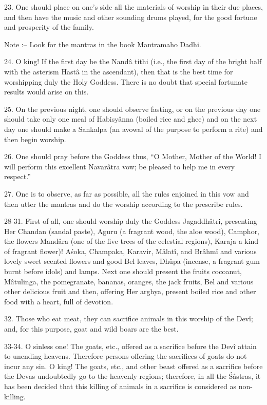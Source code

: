 23. One should place on one's side all the materials of worship in their due places, and then have the music and other sounding drums played, for the good fortune and prosperity of the family.

Note :-- Look for the mantras in the book Mantramaho Dadhi.

24. O king! If the first day be the Nand\^a tithi (i.e., the first day of the bright half with the asterism Hast\^a in the ascendant), then that is the best time for worshipping duly the Holy Goddess. There is no doubt that special fortunate results would arise on this.

25. On the previous night, one should observe fasting, or on the previous day one should take only one meal of Habisy\^anna (boiled rice and ghee) and on the next day one should make a Sankalpa (an avowal of the purpose to perform a rite) and then begin worship.

26. One should pray before the Goddess thus, ``O Mother, Mother of the World! I will perform this excellent Navar\^atra vow; be pleased to help me in every respect.''

27. One is to observe, as far as possible, all the rules enjoined in this vow and then utter the mantras and do the worship according to the prescribe rules.

28-31. First of all, one should worship duly the Goddess Jagaddh\^atri, presenting Her Chandan (sandal paste), Aguru (a fragrant wood, the aloe wood), Camphor, the flowers Mand\^ara (one of the five trees of the celestial regions), Karaja a kind of fragrant flower)! A\'soka, Champaka, Karavir, M\^alat\^i, and Br\^ahm\^i and various lovely sweet scented flowers and good Bel leaves, Dhûpa (incense, a fragrant gum burnt before idols) and lamps. Next one should present the fruits cocoanut, M\^atulinga, the pomegranate, bananas, oranges, the jack fruits, Bel and various other delicious fruit and then, offering Her arghya, present boiled rice and other food with a heart, full of devotion.

32. Those who eat meat, they can sacrifice animals in this worship of the Dev\^i; and, for this purpose, goat and wild boars are the best.

33-34. O sinless one! The goats, etc., offered as a sacrifice before the Dev\^i attain to unending heavens. Therefore persons offering the sacrifices of goats do not incur any sin. O king! The goats, etc., and other beast offered as a sacrifice before the Devas undoubtedly go to the heavenly regions; therefore, in all the \'S\^astras, it has been decided that this killing of animals in a sacrifice is considered as non-killing.

